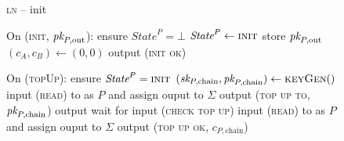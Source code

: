 \begin{figure}[H]
  \begin{processbox}{\textsc{ln} -- init}
    \begin{algorithmic}[1]
      \State {}
      \State {}
      \State On (\textsc{init}, $\textit{pk}_{P, \mathrm{out}}$):
      \Indent
        \State ensure $\textit{State}^P = \bot$
        \State $\textit{State}^P \gets \textsc{init}$
        \State store $\textit{pk}_{P, \mathrm{out}}$
        \State $(c_A, c_B) \gets (0, 0)$
        \State output (\textsc{init ok})
      \EndIndent
      \Statex

      \State On (\textsc{topUp}):
      \Indent
        \State ensure $\textit{State}^P = \textsc{init}$
        \State $(\textit{sk}_{P, \mathrm{chain}}, \textit{pk}_{P, \mathrm{chain}}) \gets
        \textsc{keyGen}()$
        \State input (\textsc{read}) to \ledger as $P$ and assign ouput to
        $\Sigma$
        \State output (\textsc{top up to}, $\textit{pk}_{P, \mathrm{chain}}$)
          \State output
          \State {}
          \State wait for input (\textsc{check top up})
          \State input (\textsc{read}) to \ledger as $P$ and assign ouput to
          $\Sigma$
        \EndWhile
        \State output (\textsc{top up ok}, $c_{P, \mathrm{chain}}$)
      \EndIndent
    \end{algorithmic}
  \end{processbox}
  \caption{}
  \label{code:ln:init}
\end{figure}

